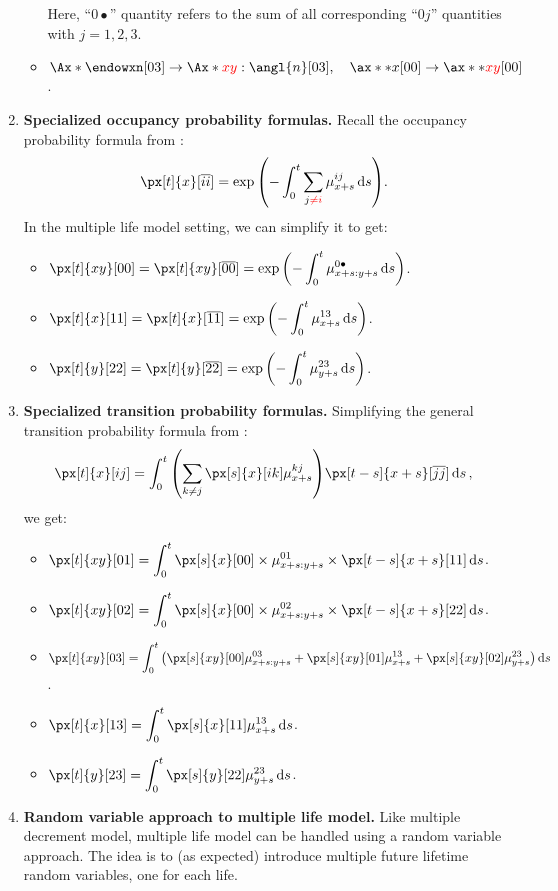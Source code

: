 \begin{enumerate}
\begin{itemize}
\begin{note}
Here, ``\(0\bullet\)'' quantity refers to the sum of all corresponding ``\(0j\)''
quantities with \(j=1,2,3\).
\end{note}
\item \(\Ax*{\endowxn}[03]\to\Ax*{\rc{xy}:\angl{n}}[03],\quad \ax**{x}[00]\to\ax**{\rc{xy}}[00]\).
\end{itemize}

\item \textbf{Specialized occupancy probability formulas.} Recall the occupancy
probability formula from :
\[
\px[t]{x}[\overline{ii}]=\exp\qty(-\int_{0}^{t}\sum_{j\rc{\ne i}}^{}\mu_{x+s}^{ij}\dd{s}).
\]
In the multiple life model setting, we can simplify it to get:
\begin{itemize}
\item \(\displaystyle \px[t]{xy}[00]=\px[t]{xy}[\overline{00}]=\exp\qty(-\int_{0}^{t}\mu_{x+s:y+s}^{0\bullet}\dd{s})\).
\item \(\displaystyle \px[t]{x}[11]=\px[t]{x}[\overline{11}]=\exp\qty(-\int_{0}^{t}\mu_{x+s}^{13}\dd{s})\).
\item \(\displaystyle \px[t]{y}[22]=\px[t]{y}[\overline{22}]=\exp\qty(-\int_{0}^{t}\mu_{y+s}^{23}\dd{s})\).
\end{itemize}
\item \textbf{Specialized transition probability formulas.} Simplifying the
general transition probability formula from :
\[
\px[t]{x}[ij]=\int_{0}^{t}\qty(\sum_{k\ne j}^{}\px[s]{x}[ik]\mu_{x+s}^{kj})
\px[t-s]{x+s}[\overline{jj}]\dd{s},
\]
we get:
\begin{itemize}
\item \(\displaystyle \px[t]{xy}[01]=\int_{0}^{t}\px[s]{x}[00]\times \mu_{x+s:y+s}^{01}\times \px[t-s]{x+s}[11]\dd{s}\).
\item \(\displaystyle \px[t]{xy}[02]=\int_{0}^{t}\px[s]{x}[00]\times \mu_{x+s:y+s}^{02}\times \px[t-s]{x+s}[22]\dd{s}\).
\item \(\displaystyle \px[t]{xy}[03]=\int_{0}^{t}\qty(\px[s]{xy}[00]\mu_{x+s:y+s}^{03}
+\px[s]{xy}[01]\mu_{x+s}^{13}
+\px[s]{xy}[02]\mu_{y+s}^{23}
)\dd{s}\).
\item \(\displaystyle \px[t]{x}[13]=\int_{0}^{t}\px[s]{x}[11]\mu_{x+s}^{13}\dd{s}\).
\item \(\displaystyle \px[t]{y}[23]=\int_{0}^{t}\px[s]{y}[22]\mu_{y+s}^{23}\dd{s}\).
\end{itemize}
\item \textbf{Random variable approach to multiple life model.} Like multiple
decrement model, multiple life model can be handled using a random variable
approach. The idea is to (as expected) introduce multiple future lifetime
random variables, one for each life.


\end{enumerate}
